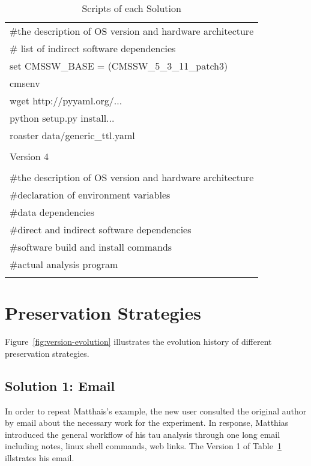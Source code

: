 \documentclass{acm_proc_article-sp}
\begin{document}
\begin{table}
\begin{tabular}{|l|}
        \#the description of OS version and hardware architecture \\
        \# list of indirect software dependencies \\
        set CMSSW\_BASE = (CMSSW\_5\_3\_11\_patch3) \\ 
        cmsenv \\
        wget http://pyyaml.org/... \\
        python setup.py install... \\
        roaster data/generic\_ttl.yaml \\
        \\ \hline
        Version 4\\ \hline
        \\
        \#the description of OS version and hardware architecture \\
        \#declaration of environment variables\\
        \#data dependencies\\
        \#direct and indirect software dependencies\\
        \#software build and install commands\\
        \#actual analysis program\\ 
        \\ \hline
    \end{tabular}
    \caption{Scripts of each Solution}
    \label{table:scripts}
\end{table}

\section{Preservation Strategies}

\begin{figure*}
\centering
{}
\caption{Version Evolution}
\label{fig:version-evolution}
\end{figure*}

Figure~\ref{fig:version-evolution} illustrates the evolution history of different preservation strategies.

\subsection{Solution 1: Email}
In order to repeat Matthais's example, the new user consulted the original author by email about the necessary work for the experiment. In response, Matthias introduced the general workflow of his tau analysis through one long email including notes, linux shell commands, web links. The Version 1 of Table~\ref{table:scripts} illstrates his email.
\end{document}
